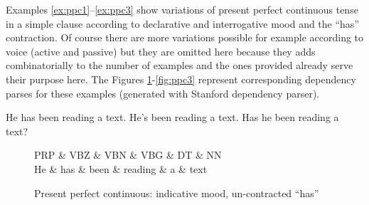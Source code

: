 Examples \ref{ex:ppc1}--\ref{ex:ppc3} show variations of present perfect continuous tense in a simple clause according to declarative and interrogative mood and the ``has'' contraction. Of course there are more variations possible for example according to voice (active and passive) but they are omitted here because they adds combinatorially to the number of examples and the ones provided already serve their purpose here. The Figures \ref{fig:ppc1}-\ref{fig:ppc3} represent corresponding dependency parses for these examples (generated with Stanford dependency parser).

\begin{exe}
	\ex\label{ex:ppc1} He has been reading a text.
	\ex\label{ex:ppc2} He's been reading a text.
	\ex\label{ex:ppc3} Has he been reading a text?
\end{exe}

	\begin{figure}[!ht]
		\centering
		\begin{dependency}
			\begin{deptext}[]
				PRP \& VBZ \& VBN \& VBG \& DT \& NN \\
				He \& has \& been \& reading \& a \& text \\
			\end{deptext}
		\end{dependency}
		\caption{Present perfect continuous: indicative mood, un-contracted ``has''}
		\label{fig:ppc1}
	\end{figure}

